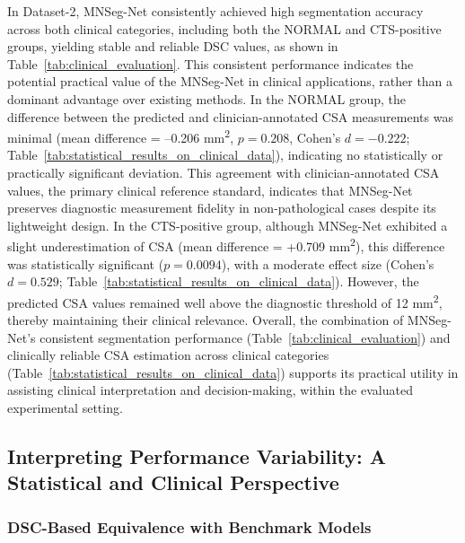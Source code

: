 In Dataset-2, MNSeg-Net consistently achieved high segmentation accuracy across both clinical categories, including both the NORMAL and CTS-positive groups, yielding stable and reliable DSC values, as shown in Table~\ref{tab:clinical_evaluation}.  This consistent performance indicates the potential practical value of the MNSeg-Net in clinical applications, rather than a dominant advantage over existing methods. In the NORMAL group, the difference between the predicted and clinician-annotated CSA measurements was minimal (mean difference = –0.206 mm\textsuperscript{2}, \(p = 0.208\), Cohen’s \(d = -0.222\); Table~\ref{tab:statistical_results_on_clinical_data}), indicating no statistically or practically significant deviation. This agreement with clinician-annotated CSA values, the primary clinical
reference standard, indicates that MNSeg-Net preserves diagnostic measurement fidelity in non-pathological cases despite its lightweight design. In the CTS-positive group, although MNSeg-Net exhibited a slight underestimation of CSA (mean difference = +0.709 mm\textsuperscript{2}), this difference was statistically significant (\(p = 0.0094\)), with a moderate effect size (Cohen’s \(d = 0.529\); Table~\ref{tab:statistical_results_on_clinical_data}). However, the predicted CSA values remained well above the diagnostic threshold of 12 mm\textsuperscript{2}, thereby maintaining their clinical relevance. 
Overall, the combination of MNSeg-Net’s consistent segmentation performance (Table~\ref{tab:clinical_evaluation}) and clinically reliable CSA estimation across clinical categories (Table~\ref{tab:statistical_results_on_clinical_data}) supports its practical utility in assisting clinical interpretation and decision-making, within the evaluated experimental setting.


\subsection{Interpreting Performance Variability: A Statistical and Clinical Perspective}\label{sec:interpreting_unfavorable_outcomes_statistical_and_clinical_perspective}


\subsubsection{DSC-Based Equivalence with Benchmark Models}

